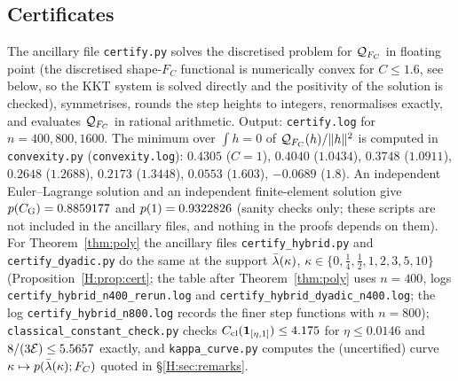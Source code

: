 \documentclass[11pt]{amsart}
\theoremstyle{definition}
\theoremstyle{remark}
\numberwithin{equation}{section}
\begin{document}
\subsection{Certificates}
The ancillary file \texttt{certify.py} solves the discretised problem for $\mathcal Q_{F_C}$ in floating point (the discretised shape-$F_C$ functional is numerically convex for $C\le1.6$, see below, so the KKT system is solved directly and the positivity of the solution is checked), symmetrises, rounds the step heights to integers, renormalises exactly, and evaluates $\mathcal Q_{F_C}$ in rational arithmetic. Output: \texttt{certify.log} for $n=400,800,1600$. The minimum over $\int h=0$ of $\mathcal Q_{F_C}(h)/\|h\|^2$ is computed in \texttt{convexity.py} (\texttt{convexity.log}): $0.4305$ ($C=1$), $0.4040$ ($1.0434$), $0.3748$ ($1.0911$), $0.2648$ ($1.2688$), $0.2173$ ($1.3448$), $0.0553$ ($1.603$), $-0.0689$ ($1.8$). An independent Euler--Lagrange solution and an independent finite-element solution give $p(C_{\mathrm G})=0.8859177$ and $p(1)=0.9322826$ (sanity checks only; these scripts are not included in the ancillary files, and nothing in the proofs depends on them). For Theorem~\ref{thm:poly} the ancillary files \texttt{certify\_hybrid.py} and \texttt{certify\_dyadic.py} do the same at the support $\bar\lambda(\kappa)$, $\kappa\in\{0,\frac14,\frac12,1,2,3,5,10\}$ (Proposition~\ref{H:prop:cert}; the table after Theorem~\ref{thm:poly} uses $n=400$, logs \texttt{certify\_hybrid\_n400\_rerun.log} and \texttt{certify\_hybrid\_dyadic\_n400.log}; the log \texttt{certify\_hybrid\_n800.log} records the finer step functions with $n=800$); \texttt{classical\_constant\_check.py} checks $C_{\mathrm{cl}}(\mathbf 1_{[\eta,1]})\le4.175$ for $\eta\le0.0146$ and $8/(3\mathcal E)\le5.5657$ exactly, and \texttt{kappa\_curve.py} computes the (uncertified) curve $\kappa\mapsto p(\bar\lambda(\kappa);F_C)$ quoted in \S\ref{H:sec:remarks}.
\end{document}
